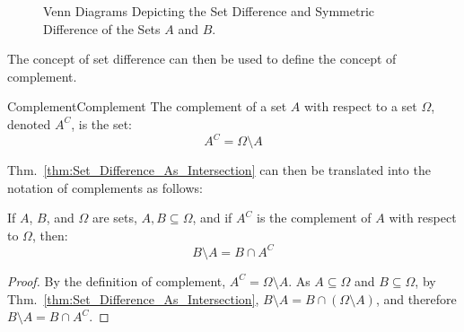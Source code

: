         \begin{figure}[H]
            \centering
            \captionsetup{type=figure}
            \begin{subfigure}[b]{0.49\textwidth}
                \centering
                
            \end{subfigure}
            \begin{subfigure}[b]{0.49\textwidth}
                \centering
                
            \end{subfigure}
            \caption[Venn Diagrams for Set Difference
                     and Symmetric Difference]
                    {Venn Diagrams Depicting the Set
                     Difference and Symmetric Difference
                     of the Sets $A$ and $B$.}
            \label{fig:Difference_Sym_Venn_Diagram}
        \end{figure}
        The concept of set difference can then be used to
        define the concept of complement.
        \begin{ldefinition}{Complement}{Complement}
            The complement of a set $A$ with respect to a set
            $\Omega$, denoted $A^{C}$, is the set:
            \begin{equation}
                A^{C}=\Omega\setminus{A}
            \end{equation}
        \end{ldefinition}
        Thm.~\ref{thm:Set_Difference_As_Intersection}
        can then be translated into the notation of
        complements as follows:
        \begin{theorem}
            If $A$, $B$, and $\Omega$ are sets,
            $A,B\subseteq\Omega$, and if $A^{C}$ is the
            complement of $A$ with respect to $\Omega$, then:
            \begin{equation}
                B\setminus{A}=B\cap{A}^{C}
            \end{equation}
        \end{theorem}
        \begin{proof}
            By the definition of complement,
            $A^{C}=\Omega\setminus{A}$.
            As $A\subseteq\Omega$ and $B\subseteq\Omega$, by
            Thm.~\ref{thm:Set_Difference_As_Intersection},
            $B\setminus{A}=B\cap(\Omega\setminus{A})$,
            and therefore $B\setminus{A}=B\cap{A}^{C}$.
        \end{proof}
